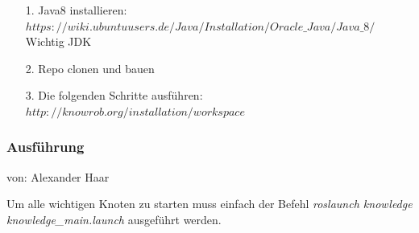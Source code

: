 \documentclass{suturo}
\makeatletter
\newcommand{\chapterauthor}[1]{%
  {\parindent0pt\vspace*{-27pt}%
  \linespread{0}\small\begin{flushright}von: #1\end{flushright}%
  \par\nobreak\vspace*{0pt}}
  \@afterheading%
}
\makeatother
\begin{document}
\begin{itemize}
\item[1.] Java8 installieren:\\
$ https://wiki.ubuntuusers.de/Java/Installation/Oracle\_Java/Java\_8/ $\\
Wichtig JDK
\item[2.] Repo clonen und bauen
\item[3.] Die folgenden Schritte ausführen: $http://knowrob.org/installation/workspace$
\end{itemize}

\subsubsection{Ausführung}
\chapterauthor{Alexander Haar}

Um alle wichtigen Knoten zu starten muss einfach der Befehl \textit{roslaunch knowledge knowledge\_main.launch} ausgeführt werden.
\end{document}
